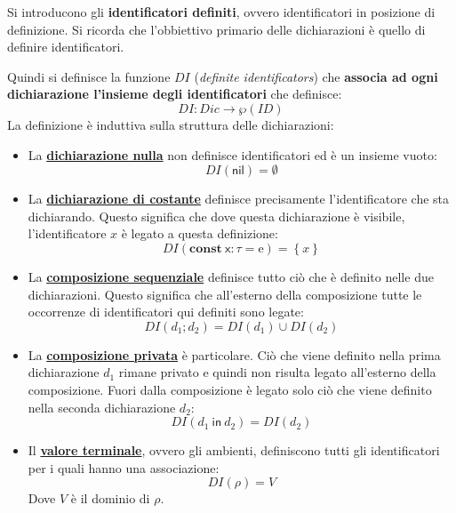 \documentclass[a4paper]{article}
\begin{document}
	Si introducono gli \textcolor{Red3}{\textbf{identificatori definiti}}, ovvero identificatori in posizione di definizione. Si ricorda che l'obbiettivo primario delle dichiarazioni è quello di definire identificatori.\newline
	
	\noindent
	Quindi si definisce la funzione $DI$ (\emph{definite identificators}) che \textbf{associa ad ogni dichiarazione l'insieme degli identificatori} che definisce:
	\begin{equation*}
		DI: Dic \longrightarrow \wp\left(ID\right)
	\end{equation*}
	La definizione è induttiva sulla struttura delle dichiarazioni:
	\begin{itemize}
		\item La \textbf{\underline{dichiarazione nulla}} non definisce identificatori ed è un insieme vuoto:
		\begin{equation*}
			DI\left(\mathsf{nil}\right) = \emptyset
		\end{equation*}
		
		\item La \textbf{\underline{dichiarazione di costante}} definisce precisamente l'identificatore che sta dichiarando. Questo significa che dove questa dichiarazione è visibile, l'identificatore $x$ è legato a questa definizione:
		\begin{equation*}
			DI\left(\mathbf{const} \: \mathsf{x}: \tau = \mathrm{e}\right) = \left\{x\right\}
		\end{equation*}
		
		\item La \textbf{\underline{composizione sequenziale}} definisce tutto ciò che è definito nelle due dichiarazioni. Questo significa che all'esterno della composizione tutte le occorrenze di identificatori qui definiti sono legate:
		\begin{equation*}
			DI\left(d_{1} ; d_{2}\right) = DI\left(d_{1}\right) \cup DI\left(d_{2}\right)
		\end{equation*}
		
		\item La \textbf{\underline{composizione privata}} è particolare. Ciò che viene definito nella prima dichiarazione $d_{1}$ rimane privato e quindi non risulta legato all'esterno della composizione. Fuori dalla composizione è legato solo ciò che viene definito nella seconda dichiarazione $d_{2}$:
		\begin{equation*}
			DI\left(d_{1} \: \mathsf{in} \: d_{2}\right) = DI\left(d_{2}\right)
		\end{equation*}
		
		\item Il \textbf{\underline{valore terminale}}, ovvero gli ambienti, definiscono tutti gli identificatori per i quali hanno una associazione:
		\begin{equation*}
			DI\left(\rho\right) = V
		\end{equation*}
		Dove $V$ è il dominio di $\rho$.
	\end{itemize}\newpage
	
\end{document}
